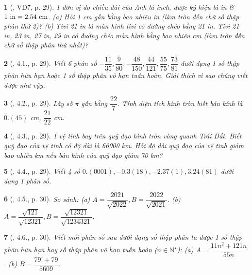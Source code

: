 \documentclass{article}
\newtheorem{baitoan}{}
\begin{document}
\begin{baitoan}[\cite{Binh_boi_duong_Toan_7_tap_1}, VD7, p. 29]
	1 đơn vị đo chiều dài của Anh là inch, được ký hiệu là {\rm in} \& $\rm1\ in = 2.54\ cm$. (a) Hỏi {\rm1 cm} gần bằng bao nhiêu {\rm in} (làm tròn đến chữ số thập phân thứ 2)? (b) Tivi {\rm21 in} là màn hình tivi có đường chéo bằng {\rm21 in}. Tivi {\rm21 in, 23 in, 27 in, 29 in} có đường chéo màn hình bằng bao nhiêu {\rm cm} (làm tròn đến chữ số thập phân thứ nhất)? 
\end{baitoan}

\begin{baitoan}[\cite{Binh_boi_duong_Toan_7_tap_1}, 4.1., p. 29]
	Viết 6 phân số $-\dfrac{11}{35},\dfrac{9}{80},-\dfrac{48}{150},\dfrac{44}{121},\dfrac{55}{75},\dfrac{73}{81}$ dưới dạng 1 số thập phân hữu hạn hoặc 1 số thập phân vô hạn tuần hoàn. Giải thích vì sao chúng viết được như vậy.
\end{baitoan}

\begin{baitoan}[\cite{Binh_boi_duong_Toan_7_tap_1}, 4.2., p. 29]
	Lấy số $\pi$ gần bằng $\dfrac{22}{7}$. Tính diện tích hình tròn biết bán kính là $0.(45)$ {\rm cm}, $\dfrac{21}{22}$ {\rm cm}.
\end{baitoan}

\begin{baitoan}[\cite{Binh_boi_duong_Toan_7_tap_1}, 4.3., p. 29]
	1 vệ tinh bay trên quỹ đạo hình tròn vòng quanh Trái Đất. Biết quỹ đạo của vệ tinh có độ dài là {\rm66000 km}. Hỏi độ dài quỹ đạo của vệ tinh giảm bao nhiêu {\rm km} nếu bán kính của quỹ đạo giảm {\rm70 km}?
\end{baitoan}

\begin{baitoan}[\cite{Binh_boi_duong_Toan_7_tap_1}, 4.4., p. 29]
	Viết 4 số $0.(0001),-0.3(18),-2.37(1),3.24(81)$ dưới dạng 1 phân số.
\end{baitoan}

\begin{baitoan}[\cite{Binh_boi_duong_Toan_7_tap_1}, 4.5., p. 30]
	So sánh: (a) $A = \dfrac{2021}{\sqrt{2022}},B = \dfrac{2022}{\sqrt{2021}}$. (b) $A = \dfrac{\sqrt{121}}{\sqrt{12321}},B = \dfrac{\sqrt{12321}}{\sqrt{1234321}}$.
\end{baitoan}

\begin{baitoan}[\cite{Binh_boi_duong_Toan_7_tap_1}, 4.6., p. 30]
	Viết mỗi phân số sau dưới dạng số thập phân ta được 1 số thập phân hữu hạn hay số thập phân vô hạn tuần hoàn ($n\in\mathbb{N}^\star$): (a) $A = \dfrac{11n^2 + 121n}{55n}$. (b) $B = \dfrac{79! + 79}{5609}$.
\end{baitoan}
\end{document}
